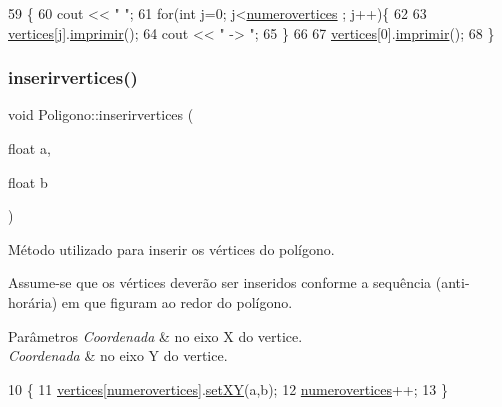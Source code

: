 \begin{DoxyCode}
59 \{
60     cout << \textcolor{stringliteral}{" "};
61     \textcolor{keywordflow}{for}(\textcolor{keywordtype}{int} j=0; j<\mbox{\hyperlink{class_poligono_adc59c72d363089aa8dc097e1f338875a}{numerovertices}} ; j++)\{
62 
63         \mbox{\hyperlink{class_poligono_a18179d267bdf366f6bb00a4e1b16f1d7}{vertices}}[j].\mbox{\hyperlink{class_point_a6c0289d808f65701bc0a28f6f282c85a}{imprimir}}();
64           cout << \textcolor{stringliteral}{" -> "};
65     \}
66 
67     \mbox{\hyperlink{class_poligono_a18179d267bdf366f6bb00a4e1b16f1d7}{vertices}}[0].\mbox{\hyperlink{class_point_a6c0289d808f65701bc0a28f6f282c85a}{imprimir}}();
68 \}
\end{DoxyCode}
\mbox{\label{class_poligono_ac011b4af1e33ff721421d72f691bd4ad}} 
\subsubsection{\texorpdfstring{inserirvertices()}{inserirvertices()}}
{\footnotesize\ttfamily void Poligono\+::inserirvertices (\begin{DoxyParamCaption}\item[{float}]{a,  }\item[{float}]{b }\end{DoxyParamCaption})}



Método utilizado para inserir os vértices do polígono. 

Assume-\/se que os vértices deverão ser inseridos conforme a sequência (anti-\/horária) em que figuram ao redor do polígono. 
\begin{DoxyParams}{Parâmetros}
{\em Coordenada} & no eixo X do vertice. \\
\hline
{\em Coordenada} & no eixo Y do vertice. \\
\hline
\end{DoxyParams}

\begin{DoxyCode}
10 \{
11     \mbox{\hyperlink{class_poligono_a18179d267bdf366f6bb00a4e1b16f1d7}{vertices}}[\mbox{\hyperlink{class_poligono_adc59c72d363089aa8dc097e1f338875a}{numerovertices}}].\mbox{\hyperlink{class_point_ab5385c6d9bfa841e641e4709fc9f14cc}{setXY}}(a,b);
12     \mbox{\hyperlink{class_poligono_adc59c72d363089aa8dc097e1f338875a}{numerovertices}}++;
13 \}
\end{DoxyCode}
\mbox{\label{class_poligono_ac9c6f6a3f13d3f1fb456c15339f3a0c6}} 
